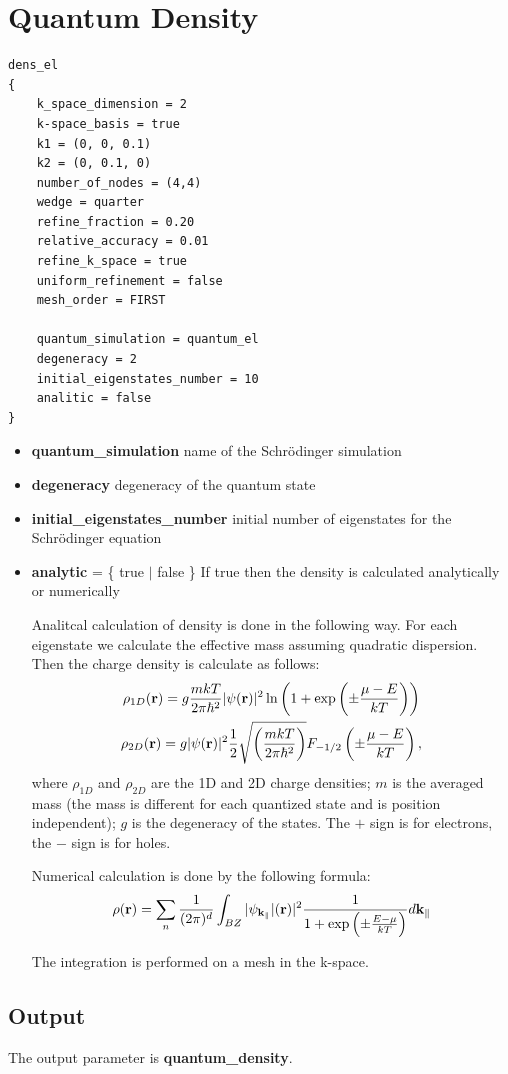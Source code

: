 \chapter{Quantum Density}
\begin{verbatim}
dens_el
{
    k_space_dimension = 2
    k-space_basis = true
    k1 = (0, 0, 0.1)
    k2 = (0, 0.1, 0)
    number_of_nodes = (4,4)
    wedge = quarter
    refine_fraction = 0.20
    relative_accuracy = 0.01
    refine_k_space = true
    uniform_refinement = false
    mesh_order = FIRST
    
    quantum_simulation = quantum_el
    degeneracy = 2
    initial_eigenstates_number = 10
    analitic = false
}
\end{verbatim}
\begin{itemize}
 \item \textbf{quantum\_simulation} name of the Schr\"odinger simulation
 \item \textbf{degeneracy} degeneracy of the quantum state
 \item \textbf{initial\_eigenstates\_number} initial number of eigenstates for  the
 Schr\"odinger equation
 \item \textbf{analytic} = \{ true $\vert$ false \} If true then the density is calculated 
analytically or numerically

Analitcal calculation of density is done in the following way. For each eigenstate we calculate the effective mass assuming quadratic dispersion. Then the charge density is calculate as follows:
\begin{gather}
   \rho_{1D}({\bf r}) = g\frac{mkT}{2 \pi \hbar^2}  |\psi({\bf r})|^2 \ln \left(1 + 
\exp \left( \pm \frac{\mu - E}{kT} \right) \right) \\      
\rho_{2D}({\bf r}) = g|\psi({\bf r})|^2 \frac{1}{2} \sqrt{\left( \frac{mkT}{2\pi\hbar^2} \right)}  F_{-1/2}\left( \pm \frac{\mu - E}{kT}         \right),       
\end{gather}
where $\rho_{1D}$ and $\rho_{2D}$ are the 1D and 2D charge densities; $m$ is the averaged mass (the mass is different for each quantized state and is position independent); $g$ is the degeneracy of the states.  The $+$ sign is for electrons, the $-$ sign is for holes.

Numerical calculation is done by the following formula:
\begin{equation}
 \rho({\bf r}) = \sum_n \frac {1}{(2\pi)^d} \int_{BZ} |\psi_{\bf k_{\|}}|({\bf r})|^2 \frac{1}{1+\exp 
\left(\pm \frac{E-\mu}{kT} \right)} d{\bf k_{\|}}
\end{equation}

The integration is performed on a mesh in the k-space. 

\end{itemize}

\section{Output}
The output parameter is \textbf{quantum\_density}.

